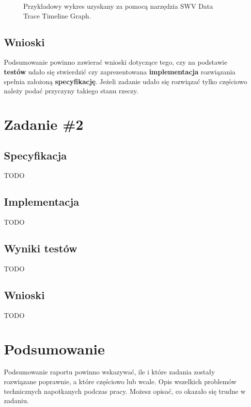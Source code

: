 \documentclass[11pt, a4paper]{article}
\begin{document}
\begin{figure}[H]
	\caption{Przykładowy wykres uzyskany za pomocą narzędzia SWV Data Trace Timeline Graph.}
	\label{fig:fig2}
\end{figure}

\subsection{Wnioski}
Podsumowanie powinno zawierać wnioski dotyczące tego, czy na podstawie \textbf{testów} udało się stwierdzić czy zaprezentowana \textbf{implementacja} rozwiązania spełnia założoną \textbf{specyfikację}. Jeżeli zadanie udało się rozwiązać tylko częściowo należy podać przyczyny takiego stanu rzeczy.

\newpage

\section{Zadanie \#2}

\subsection{Specyfikacja}
\guillemotleft TODO \guillemotright

\subsection{Implementacja}
\guillemotleft TODO \guillemotright

\subsection{Wyniki testów}
\guillemotleft TODO \guillemotright

\subsection{Wnioski}
\guillemotleft TODO \guillemotright

\newpage

\section*{Podsumowanie} 
Podsumowanie raportu powinno wskazywać, ile i które zadania zostały rozwiązane poprawnie, a które częściowo lub wcale. Opis wszelkich problemów technicznych napotkanych podczas pracy. Możesz opisać, co okazało się trudne w zadaniu.

\printbibliography[heading=bibintoc]
\end{document}

